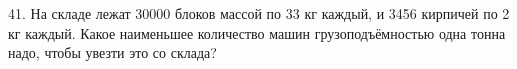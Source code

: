 41. На складе лежат 30000 блоков массой по 33 кг каждый, и 3456 кирпичей по 2 кг каждый. Какое наименьшее количество машин грузоподъёмностью одна тонна надо, чтобы увезти это со склада?\\
